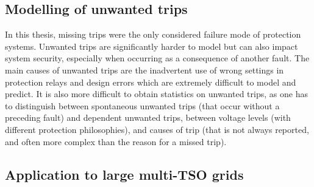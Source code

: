 \subsection*{Modelling of unwanted trips}

In this thesis, missing trips were the only considered failure mode of protection systems. Unwanted trips are significantly harder to model but can also impact system security, especially when occurring as a consequence of another fault. The main causes of unwanted trips are the inadvertent use of wrong settings in protection relays and design errors which are extremely difficult to model and predict. It is also more difficult to obtain statistics on unwanted trips, as one has to distinguish between spontaneous unwanted trips (that occur without a preceding fault) and dependent unwanted trips, between voltage levels (with different protection philosophies), and causes of trip (that is not always reported, and often more complex than the reason for a missed trip).


\subsection*{Application to large multi-TSO grids}

